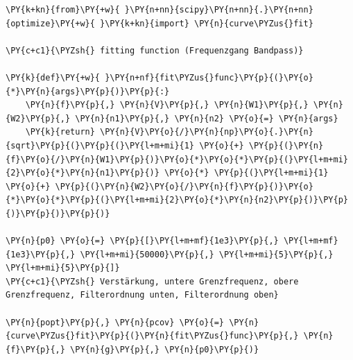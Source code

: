     \begin{tcolorbox}[breakable, size=fbox, boxrule=1pt, pad at break*=1mm,colback=cellbackground, colframe=cellborder]
\begin{Verbatim}[commandchars=\\\{\}]
\PY{k+kn}{from}\PY{+w}{ }\PY{n+nn}{scipy}\PY{n+nn}{.}\PY{n+nn}{optimize}\PY{+w}{ }\PY{k+kn}{import} \PY{n}{curve\PYZus{}fit}

\PY{c+c1}{\PYZsh{} fitting function (Frequenzgang Bandpass)}

\PY{k}{def}\PY{+w}{ }\PY{n+nf}{fit\PYZus{}func}\PY{p}{(}\PY{o}{*}\PY{n}{args}\PY{p}{)}\PY{p}{:}
    \PY{n}{f}\PY{p}{,} \PY{n}{V}\PY{p}{,} \PY{n}{W1}\PY{p}{,} \PY{n}{W2}\PY{p}{,} \PY{n}{n1}\PY{p}{,} \PY{n}{n2} \PY{o}{=} \PY{n}{args}
    \PY{k}{return} \PY{n}{V}\PY{o}{/}\PY{n}{np}\PY{o}{.}\PY{n}{sqrt}\PY{p}{(}\PY{p}{(}\PY{l+m+mi}{1} \PY{o}{+} \PY{p}{(}\PY{n}{f}\PY{o}{/}\PY{n}{W1}\PY{p}{)}\PY{o}{*}\PY{o}{*}\PY{p}{(}\PY{l+m+mi}{2}\PY{o}{*}\PY{n}{n1}\PY{p}{)} \PY{o}{*} \PY{p}{(}\PY{l+m+mi}{1} \PY{o}{+} \PY{p}{(}\PY{n}{W2}\PY{o}{/}\PY{n}{f}\PY{p}{)}\PY{o}{*}\PY{o}{*}\PY{p}{(}\PY{l+m+mi}{2}\PY{o}{*}\PY{n}{n2}\PY{p}{)}\PY{p}{)}\PY{p}{)}\PY{p}{)}

\PY{n}{p0} \PY{o}{=} \PY{p}{[}\PY{l+m+mf}{1e3}\PY{p}{,} \PY{l+m+mf}{1e3}\PY{p}{,} \PY{l+m+mi}{50000}\PY{p}{,} \PY{l+m+mi}{5}\PY{p}{,} \PY{l+m+mi}{5}\PY{p}{]} 
\PY{c+c1}{\PYZsh{} Verstärkung, untere Grenzfrequenz, obere Grenzfrequenz, Filterordnung unten, Filterordnung oben}

\PY{n}{popt}\PY{p}{,} \PY{n}{pcov} \PY{o}{=} \PY{n}{curve\PYZus{}fit}\PY{p}{(}\PY{n}{fit\PYZus{}func}\PY{p}{,} \PY{n}{f}\PY{p}{,} \PY{n}{g}\PY{p}{,} \PY{n}{p0}\PY{p}{)}


\end{Verbatim}
\end{tcolorbox}
